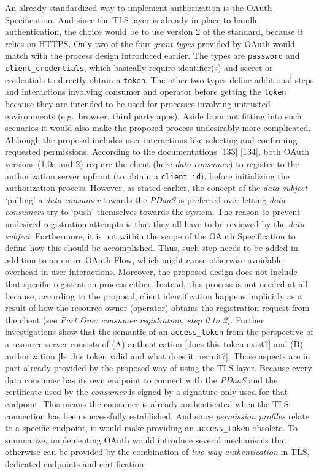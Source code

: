 \documentclass[12pt,english,a4paper,titlepage,cleardoublepage=empty,dottedtoc]{report}
\begin{document}
An already standardized way to implement authorization is the
\protect\hyperlink{def--oauth}{OAuth} Specification. And since the TLS
layer is already in place to handle authentication, the choice would be
to use version 2 of the standard, because it relies on HTTPS. Only two
of the four \emph{grant types} provided by OAuth would match with the
process design introduced earlier. The types are \texttt{password} and
\texttt{client\_credentials}, which basically require identifier(s) and
secret or credentials to directly obtain a \texttt{token}. The other two
types define additional steps and interactions involving consumer and
operator before getting the \texttt{token} because they are intended to
be used for processes involving untrusted environments (e.g.~browser,
third party apps). Aside from not fitting into such scenarios it would
also make the proposed process undesirably more complicated. Although
the proposal includes user interactions like selecting and confirming
requested permissions. According to the documentations
{[}\protect\hyperlink{ref-web_spec_oauth-1a_client-reg}{133}{]}
{[}\protect\hyperlink{ref-web_spec_oauth-2_client-reg}{134}{]}, both
OAuth versions (1.0a and 2) require the client (here \emph{data
consumer}) to register to the authorization server upfront (to obtain a
\texttt{client\_id}), before initializing the authorization process.
However, as stated earlier, the concept of the \emph{data subject}
`pulling' a \emph{data consumer} towards the \emph{PDaaS} is preferred
over letting \emph{data consumers} try to `push' themselves towards the
system. The reason to prevent undesired registration attempts is that
they all have to be reviewed by the \emph{data subject}. Furthermore, it
is not within the scope of the OAuth Specification to define how this
should be accomplished. Thus, such step needs to be added in addition to
an entire OAuth-Flow, which might cause otherwise avoidable overhead in
user interactions. Moreover, the proposed design does not include that
specific registration process either. Instead, this process is not
needed at all because, according to the proposal, client identification
happens implicitly as a result of how the resource owner (operator)
obtains the registration request from the client (see \emph{Part One:
consumer registration, step 0 to 2}). Further investigations show that
the semantic of an \texttt{access\_token} from the perspective of a
resource server consists of (A) authentication {[}does this token
exist?{]} and (B) authorization {[}Is this token valid and what does it
permit?{]}. Those aspects are in part already provided by the proposed
way of using the TLS layer. Because every data consumer has its own
endpoint to connect with the \emph{PDaaS} and the certificate used by
the \emph{consumer} is signed by a signature only used for that
endpoint. This means the consumer is already authenticated when the TLS
connection has been successfully established. And since \emph{permission
profiles} relate to a specific endpoint, it would make providing an
\texttt{access\_token} obsolete. To summarize, implementing OAuth would
introduce several mechanisms that otherwise can be provided by the
combination of \emph{two-way authentication} in TLS, dedicated endpoints
and certification.
\end{document}
